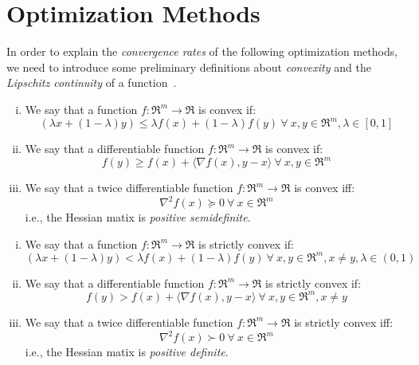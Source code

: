 
\section{Optimization Methods}

In order to explain the \emph{convergence rates} of the following optimization methods, we need to introduce some preliminary definitions about \emph{convexity} and the \emph{Lipschitz continuity} of a function~\cite{boyd2004convex}.

\begin{definition}[Convexity] \label{def:convexity}
	\hfill
	\begin{enumerate}[(i)]
		\item We say that a function $f: \Re^m \rightarrow \Re$ is convex if: 
		$$ 
			(\lambda x + (1 - \lambda) y ) \leq \lambda f(x) + (1 - \lambda) f(y) \ \forall \ x, y \in \Re^m, \lambda \in [0,1] 
		$$
		\item We say that a differentiable function $f: \Re^m \rightarrow \Re$ is convex if: 
		$$ 
			f(y) \geq f(x) + \langle \nabla f(x), y - x \rangle \ \forall \ x, y \in \Re^m 
		$$
		\item We say that a twice differentiable function $f: \Re^m \rightarrow \Re$ is convex iff: 
		$$ 
			\nabla^2 f(x) \succeq 0 \ \forall \ x \in \Re^m 
		$$ i.e., the Hessian matix is \emph{positive semidefinite}.
	\end{enumerate}
\end{definition}

\begin{definition} \label{def:strict_convexity}
	\hfill
	\begin{enumerate}[(i)]
		\item We say that a function $f: \Re^m \rightarrow \Re$ is strictly convex if: 
		$$ 
			(\lambda x + (1 - \lambda) y ) < \lambda f(x) + (1 - \lambda) f(y) \ \forall \ x, y \in \Re^m, x \neq y, \lambda \in (0,1) 
		$$
		\item We say that a differentiable function $f: \Re^m \rightarrow \Re$ is strictly convex if: 
		$$ 
			f(y) > f(x) + \langle \nabla f(x), y - x \rangle \ \forall \ x, y \in \Re^m, x \neq y
		$$
		\item We say that a twice differentiable function $f: \Re^m \rightarrow \Re$ is strictly convex iff: 
		$$ 
			\nabla^2 f(x) \succ 0 \ \forall \ x \in \Re^m 
		$$ i.e., the Hessian matix is \emph{positive definite}.
	\end{enumerate}
\end{definition}


